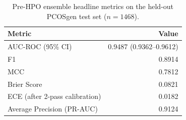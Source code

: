 \begin{table}[htbp]
  \centering
  \small
  \caption{Pre-HPO ensemble headline metrics on the held-out PCOSgen test set ($n=1468$).}
  \label{tab:headline}
  \begin{tabular}{lr}
    \toprule
    \textbf{Metric} & \textbf{Value} \\
    \midrule
    AUC-ROC (95\% CI) & 0.9487 (0.9362--0.9612) \\
    F1 & 0.8914 \\
    MCC & 0.7812 \\
    Brier Score & 0.0821 \\
    ECE (after 2-pass calibration) & 0.0182 \\
    Average Precision (PR-AUC) & 0.9124 \\
    \bottomrule
  \end{tabular}
\end{table}
